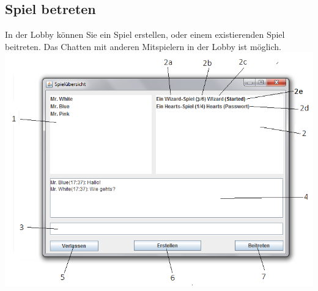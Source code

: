 \documentclass[titlepage,10pt,a4paper]{article}
\begin{document}
\subsection{Spiel betreten}
In der \gls{Lobby} können Sie ein Spiel erstellen, oder einem existierenden Spiel beitreten. Das Chatten mit anderen Mitspielern in der \gls{Lobby} ist möglich.\\
\includegraphics[width=\textwidth]{Lobby-Fenster}
\end{document}
